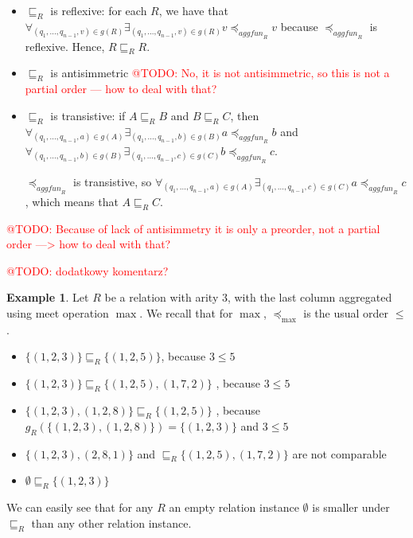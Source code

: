 \documentclass{pracamgr}
\makeatletter
\theoremstyle{plain}
\theoremstyle{definition}
\newtheorem{exmp}{Example}[section]
\theoremstyle{remark}
\newcommand{\todo}[1]{\textcolor{red}{@TODO: #1}}
\newcommand{\aggfun}{\textit{aggfun} }
\makeatother
\begin{document}
\begin{itemize}
\item $\sqsubseteq_R$ is reflexive: for each $R$, we have that  $\forall_{(q_1, ..., q_{n-1}, v) \in g(R)} \exists_{(q_1, ..., q_{n-1}, v) \in g(R)} v \preceq_{\aggfun_R} v $ because $\preceq_{\aggfun_R}$ is reflexive. Hence, $R \sqsubseteq_R R$.
\item $\sqsubseteq_R$ is antisimmetric \todo{No, it is not antisimmetric, so this is not a partial order --- how to deal with that?}
\item $\sqsubseteq_R$ is transistive: if $A \sqsubseteq_R B$ and $B \sqsubseteq_R  C$, then $\forall_{(q_1, ..., q_{n-1}, a) \in g(A)} \exists_{(q_1, ..., q_{n-1}, b) \in g(B)} a \preceq_{\aggfun_R} b $ and $\forall_{(q_1, ..., q_{n-1}, b) \in g(B)} \exists_{(q_1, ..., q_{n-1}, c) \in g(C)} b \preceq_{\aggfun_R} c$.

$\preceq_{\aggfun_R}$ is transistive, so $\forall_{(q_1, ..., q_{n-1}, a) \in g(A)} \exists_{(q_1, ..., q_{n-1}, c) \in g(C)} a \preceq_{\aggfun_R} c $, which means that $A \sqsubseteq_R C$.
\end{itemize}

\todo{Because of lack of antisimmetry it is only a preorder, not a partial order ---> how to deal with that?}

\todo{dodatkowy komentarz?}

\begin{exmp}
Let $R$ be a relation with arity $3$, with the last column aggregated using meet operation $\max$.
We recall that for $ \max $, $ \preceq_{\max} $ is the usual order $ \le $.
\begin{itemize}
\item $\{(1, 2, 3)\} \sqsubseteq_R \{(1, 2, 5)\}$, because $3 \le 5$
\item $\{(1, 2, 3)\} \sqsubseteq_R \{(1, 2, 5), (1, 7, 2)\}$ , because $3 \le 5$
\item $\{(1, 2, 3), (1, 2, 8)\} \sqsubseteq_R \{(1, 2, 5)\}$ , because $g_R(\{(1, 2, 3), (1, 2, 8)\}) = \{(1,2,3)\}$ and $3 \le 5$
\item $\{(1, 2, 3), (2, 8, 1)\}$ and  $\sqsubseteq_R \{(1, 2, 5), (1, 7, 2)\}$ are not comparable
\item $\emptyset \sqsubseteq_R \{(1, 2, 3)\}$
\end{itemize}
\end{exmp}

We can easily see that for any $R$ an empty relation instance $\emptyset$ is smaller under $\sqsubseteq_R$  than any other relation instance.
\end{document}
